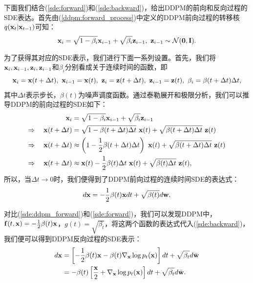 \documentclass[11pt,a4paper,UTF8]{ctexart}
\begin{document}
下面我们结合(\ref{sde:forward})和(\ref{sde:backward})，给出DDPM的前向和反向过程的SDE表达。首先由(\ref{ddpm:forward_process})中定义的DDPM前向过程的转移核$q(\mathbf{x}_t|\mathbf{x}_{t-1})$可知：
\begin{equation*}
    \x_i = \sqrt{1-\beta_i}\x_{i-1} + \sqrt{\beta_i}\z_{i-1},\ \z_{i-1}\sim\N(\mathbf{0},\mathbf{I}).
\end{equation*}

为了获得其对应的SDE表示，我们进行下面一系列设置。首先，我们将$\mathbf{x}_i,\mathbf{x}_{i-1},\mathbf{z}_i,\mathbf{z}_{i-1}$和$\beta_i$分别看成关于连续时间的函数，即
\begin{equation*}
    \x_i=\x(t+\Delta t),\ \x_{i-1}=\x(t),\ \z_i=\z(t+\Delta t),\ \z_{i-1}=\z(t),\ \beta_i = \beta(t+\Delta t)\Delta t,
\end{equation*}
其中$\Delta t$表示步长，$\beta(t)$为噪声调度函数。通过泰勒展开和极限分析，我们可以推导DDPM的前向过程的SDE如下：
\begin{align*}
\begin{split}
     \mathbf{x}_i &= \sqrt{1-\beta_i}\mathbf{x}_{i-1} + \sqrt{\beta_i}\mathbf{z}_{i-1} \\
    \Rightarrow\quad  \mathbf{x}(t+\Delta t) &= \sqrt{1-\beta(t+\Delta t)\Delta t}\ \mathbf{x}(t) + \sqrt{ \beta(t+\Delta t)\Delta t}\ \mathbf{z}(t) \\
    \Rightarrow\quad \mathbf{x}(t+\Delta t) &\approx \left(1- \frac{1}{2}\beta(t+\Delta t)\Delta t\right)\ \mathbf{x}(t) + \sqrt{ \beta(t+\Delta t)\Delta t}\ \mathbf{z}(t) \\
    \Rightarrow\quad \mathbf{x}(t+\Delta t) &\approx \mathbf{x}(t) - \frac{1}{2}\beta(t)\Delta t\ \mathbf{x}(t) + \sqrt{ \beta(t)\Delta t}\ \mathbf{z}(t),
\end{split}
\end{align*}
所以，当$\Delta t\rightarrow 0$时，我们便得到了DDPM前向过程的连续时间SDE的表达式：
\begin{equation}
    d\mathbf{x} = -\frac{1}{2}\beta(t)\mathbf{x} dt + \sqrt{\beta(t)}d\mathbf{w}.
\label{sde:ddpm_forward}
\end{equation}

对比(\ref{sde:ddpm_forward})和(\ref{sde:forward})，我们可以发现DDPM中，$\mathbf{f}(t,\mathbf{x})=-\frac{1}{2}\beta(t)\mathbf{x}$，$g(t)=\sqrt{\beta_t}$，将这两个函数的表达式代入(\ref{sde:backward})，我们便可以得到DDPM反向过程的SDE表示：
\begin{align}
\begin{split}
    d\mathbf{x} &= \left[-\frac{1}{2}\beta(t)\mathbf{x} -\beta(t) \nabla_{\mathbf{x}} \log p_t(\mathbf{x}) \right] dt + \sqrt{\beta_t} d\bar{\mathbf{w}} \\
    &= -\beta(t) \left[\frac{\mathbf{x}}{2} + \nabla_{\mathbf{x}} \log p_t(\mathbf{x}) \right]dt + \sqrt{\beta_t} d\bar{\mathbf{w}}.
\end{split} 
\label{sde:ddpm_backward}
\end{align}
\end{document}
